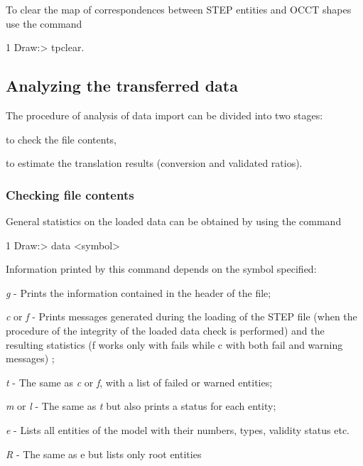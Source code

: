 To clear the map of correspondences between S\+T\+EP entities and O\+C\+CT shapes use the command
\begin{DoxyCode}
1 Draw:> tpclear. 
\end{DoxyCode}
\hypertarget{occt_user_guides__step_occt_step_6_4}{}\subsection{Analyzing the transferred data}\label{occt_user_guides__step_occt_step_6_4}
The procedure of analysis of data import can be divided into two stages\+:
\begin{DoxyEnumerate}
\item to check the file contents,
\item to estimate the translation results (conversion and validated ratios).
\end{DoxyEnumerate}\hypertarget{occt_user_guides__step_occt_step_6_4_1}{}\subsubsection{Checking file contents}\label{occt_user_guides__step_occt_step_6_4_1}
General statistics on the loaded data can be obtained by using the command


\begin{DoxyCode}
1 Draw:> data <symbol> 
\end{DoxyCode}


Information printed by this command depends on the symbol specified\+:


\begin{DoxyItemize}
\item {\itshape g} -\/ Prints the information contained in the header of the file;
\item {\itshape c} or {\itshape f} -\/ Prints messages generated during the loading of the S\+T\+EP file (when the procedure of the integrity of the loaded data check is performed) and the resulting statistics (f works only with fails while c with both fail and warning messages) ;
\item {\itshape t} -\/ The same as {\itshape c} or {\itshape f}, with a list of failed or warned entities;
\item {\itshape m} or {\itshape l} -\/ The same as {\itshape t} but also prints a status for each entity;
\item {\itshape e} -\/ Lists all entities of the model with their numbers, types, validity status etc.
\item {\itshape R} -\/ The same as e but lists only root entities
\end{DoxyItemize}

